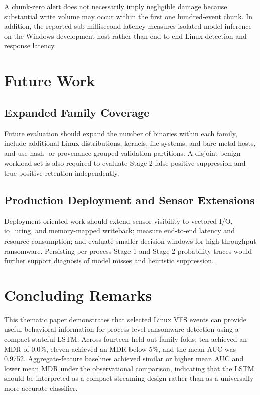 A chunk-zero alert does not necessarily imply negligible damage because substantial write volume may occur within the first one hundred-event chunk. In addition, the reported sub-millisecond latency measures isolated model inference on the Windows development host rather than end-to-end Linux detection and response latency.

\section{Future Work}\label{sec:5.4}

\subsection{Expanded Family Coverage}\label{sec:5.4.1}

Future evaluation should expand the number of binaries within each family, include additional Linux distributions, kernels, file systems, and bare-metal hosts, and use hash- or provenance-grouped validation partitions. A disjoint benign workload set is also required to evaluate Stage 2 false-positive suppression and true-positive retention independently.

\subsection{Production Deployment and Sensor Extensions}\label{sec:5.4.2}

Deployment-oriented work should extend sensor visibility to vectored I/\allowbreak{}O, io\_\allowbreak{}uring, and memory-mapped writeback; measure end-to-end latency and resource consumption; and evaluate smaller decision windows for high-throughput ransomware. Persisting per-process Stage 1 and Stage 2 probability traces would further support diagnosis of model misses and heuristic suppression.

\section{Concluding Remarks}\label{sec:5.5}

This thematic paper demonstrates that selected Linux VFS events can provide useful behavioral information for process-level ransomware detection using a compact stateful \textmu{}LSTM. Across fourteen held-out-family folds, ten achieved an MDR of 0.0\%, eleven achieved an MDR below 5\%, and the mean AUC was 0.9752. Aggregate-feature baselines achieved similar or higher mean AUC and lower mean MDR under the observational comparison, indicating that the \textmu{}LSTM should be interpreted as a compact streaming design rather than as a universally more accurate classifier.

